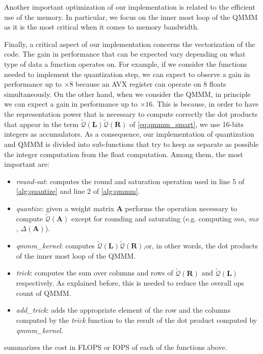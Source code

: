 Another important optimization of our implementation is related to the efficient use of the memory. In particular, we focus on the inner most loop of the QMMM as it is the most critical when it comes to memory bandwidth.


Finally, a critical aspect of our implementation concerns the vectorization of the code. The gain in performance that can be expected vary depending on what type of data a function operates on. For example, if we consider the functions needed to implement the quantization step, we can expect to observe a gain in performance up to $\times 8$ because an AVX register can operate on $8$ floats simultaneously. On the other hand, when we  consider the QMMM, in principle we can expect a gain in performance up to $\times 16$. This is because, in order to have the representation power that is necessary to compute correctly the dot products that appear in the term $ \tilde{\mathcal{Q}}(\mathbf{L}) \tilde{\mathcal{Q}}(\mathbf{R})$ of \cref{eq:qmmm_smart}, we use 16-bits integers as accumulators. As a consequence, our implementation of quantization and QMMM is divided into sub-functions that try to keep as separate as possible the integer computation from the float computation. Among them,  the most important are:

\begin{itemize}
\item \emph{round-sat}: computes the round and saturation operation used in line 5 of \cref{alg:quantize} and line 2 of \cref{alg:qmmm}.
\item \emph{quantize}: given a weight matrix $\mathbf{A}$ performs the operation necessary to compute  $\tilde{\mathcal{Q}}(\mathbf{A}) $ except for rounding and saturating (e.g. computing $mn$, $mx$, $\Delta(\mathbf{A})$).
\item \emph{qmmm\_kernel}: computes $ \tilde{\mathcal{Q}}(\mathbf{L}) \tilde{\mathcal{Q}}(\mathbf{R})$,or, in other words, the dot products of the inner most loop of the QMMM.
\item \emph{trick}: computes the sum over columns and rows of $\tilde{\mathcal{Q}}(\mathbf{R})$ and $\tilde{\mathcal{Q}}(\mathbf{L})$ respectively. As explained before, this is needed to reduce the overall ops count of QMMM. 
\item \emph{add\_trick}: adds the appropriate element of the row and the columns computed by the \emph{trick} function to the result of the dot product computed by \emph{qmmm\_kernel}.
\end{itemize}
 summarizes the cost in FLOPS or IOPS of each of the functions above.

